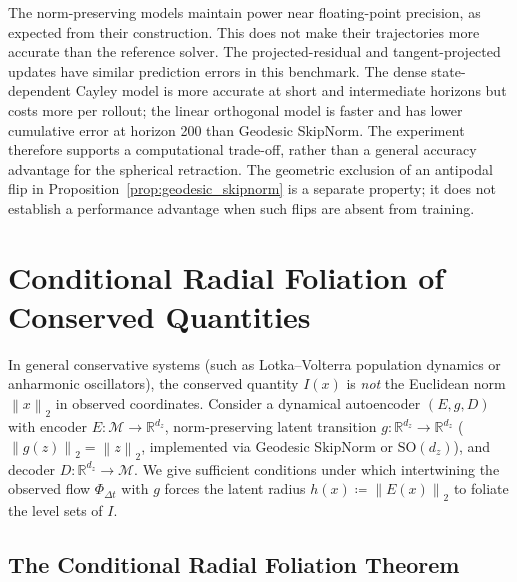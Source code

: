 \documentclass[10pt]{article}
\theoremstyle{definition}
\theoremstyle{remark}
\newcommand{\R}{\mathbb{R}}
\newcommand{\norm}[1]{\left\lVert #1 \right\rVert}
\begin{document}
The norm-preserving models maintain power near floating-point precision, as expected from their construction. This does not make their trajectories more accurate than the reference solver. The projected-residual and tangent-projected updates have similar prediction errors in this benchmark. The dense state-dependent Cayley model is more accurate at short and intermediate horizons but costs more per rollout; the linear orthogonal model is faster and has lower cumulative error at horizon 200 than Geodesic SkipNorm. The experiment therefore supports a computational trade-off, rather than a general accuracy advantage for the spherical retraction. The geometric exclusion of an antipodal flip in Proposition~\ref{prop:geodesic_skipnorm} is a separate property; it does not establish a performance advantage when such flips are absent from training.

\section{Conditional Radial Foliation of Conserved Quantities}
\label{sec:foliation}

In general conservative systems (such as Lotka--Volterra population dynamics or anharmonic oscillators), the conserved quantity $I(x)$ is \emph{not} the Euclidean norm $\norm{x}_2$ in observed coordinates. Consider a dynamical autoencoder $(E, g, D)$ with encoder $E: \mathcal{M} \to \R^{d_z}$, norm-preserving latent transition $g: \R^{d_z} \to \R^{d_z}$ ($\norm{g(z)}_2 = \norm{z}_2$, implemented via Geodesic SkipNorm or $\mathrm{SO}(d_z)$), and decoder $D: \R^{d_z} \to \mathcal{M}$. We give sufficient conditions under which intertwining the observed flow $\Phi_{\Delta t}$ with $g$ forces the latent radius $h(x) \coloneqq \norm{E(x)}_2$ to foliate the level sets of $I$.

\subsection{The Conditional Radial Foliation Theorem}
\end{document}

